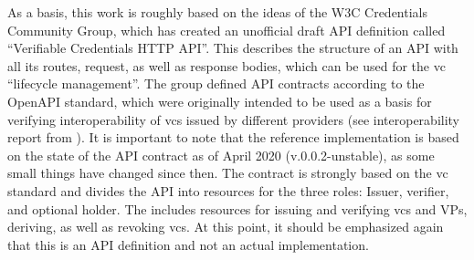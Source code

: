     As a basis, this work is roughly based on the ideas of the W3C Credentials Community Group, which has created an unofficial draft API definition called “Verifiable Credentials HTTP API”. This describes the structure of an API with all its routes, request, as well as response bodies, which can be used for the \ac{vc} “lifecycle management”. The group defined API contracts according to the OpenAPI standard, which were originally intended to be used as a basis for verifying interoperability of \acp{vc} issued by different providers (see interoperability report from \cite{homeland_security_preventing_2020}). It is important to note that the reference implementation is based on the state of the API contract as of April 2020 (v.0.0.2-unstable), as some small things have changed since then. The contract is strongly based on the \ac{vc} standard and divides the API into resources for the three roles: Issuer, verifier, and optional holder. The includes resources for issuing and verifying \acp{vc} and \acp{VP}, deriving, as well as revoking \acp{vc}. At this point, it should be emphasized again that this is an API definition and not an actual implementation. \cite{world_wide_web_consortium_credentials_community_group_vc_2021, world_wide_web_consortium_credentials_community_group_verifiable_2021}
    
